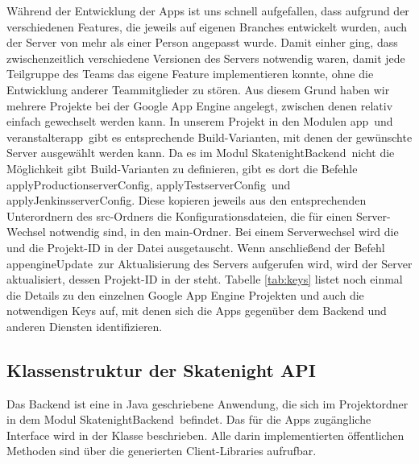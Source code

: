 Während der Entwicklung der Apps ist uns schnell aufgefallen, dass aufgrund der verschiedenen Features, die jeweils auf eigenen Branches entwickelt wurden, auch der Server von mehr als einer Person angepasst wurde. Damit einher ging, dass zwischenzeitlich verschiedene Versionen des Servers notwendig waren, damit jede Teilgruppe des Teams das eigene Feature implementieren konnte, ohne die Entwicklung anderer Teammitglieder zu stören. Aus diesem Grund haben wir mehrere Projekte bei der Google App Engine angelegt, zwischen denen relativ einfach gewechselt werden kann. In unserem Projekt in den Modulen \glqq app\grqq\ und \glqq veranstalterapp\grqq\ gibt es entsprechende Build-Varianten, mit denen der gewünschte Server ausgewählt werden kann. Da es im Modul \glqq SkatenightBackend\grqq\ nicht die Möglichkeit gibt Build-Varianten zu definieren, gibt es dort die Befehle \glqq applyProductionserverConfig\grqq, \glqq applyTestserverConfig\grqq\ und \glqq applyJenkinsserverConfig\grqq. Diese kopieren jeweils aus den entsprechenden Unterordnern des src-Ordners die Konfigurationsdateien, die für einen Server-Wechsel notwendig sind, in den main-Ordner. Bei einem Serverwechsel wird die  und die Projekt-ID in der Datei  ausgetauscht. Wenn anschließend der Befehl \glqq appengineUpdate\grqq\ zur Aktualisierung des Servers aufgerufen wird, wird der Server aktualisiert, dessen Projekt-ID in der  steht. Tabelle \ref{tab:keys} listet noch einmal die Details zu den einzelnen Google App Engine Projekten und auch die notwendigen Keys auf, mit denen sich die Apps gegenüber dem Backend und anderen Diensten identifizieren.

\subsection{Klassenstruktur der Skatenight API}
Das Backend ist eine in Java geschriebene Anwendung, die sich im Projektordner in dem Modul \glqq SkatenightBackend\grqq\ befindet. Das für die Apps zugängliche Interface wird in der Klasse  beschrieben. Alle darin implementierten öffentlichen Methoden sind über die generierten Client-Libraries aufrufbar.

